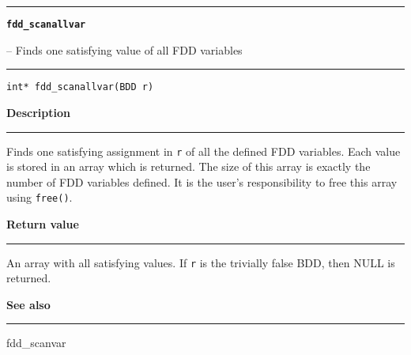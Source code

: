 \begin{minipage}{\textwidth}

\noindent\begin{minipage}{\textwidth}
\rule{\textwidth}{0.5mm}
{\tt\bf fdd\_scanallvar }
\--- Finds one satisfying value of all FDD variables  \hspace{\fill}
\\\rule[1.5ex]{\textwidth}{0.5mm}
\end{minipage}

\noindent\begin{verbatim}
int* fdd_scanallvar(BDD r) 
\end{verbatim}

\vspace{\parsep}\noindent
{\bf Description}\\\rule[1.5ex]{\textwidth}{0.2mm}\vspace{-1.5ex}\setlength{\parindent}{1em}
Finds one satisfying assignment in {\tt r} of all the defined
           FDD variables. Each value is stored in an array which is
	   returned. The size of this array is exactly the number of
	   FDD variables defined. It is the user's responsibility to
	   free this array using {\tt free()}. 

\setlength{\parindent}{0em}\vspace{\parsep}\vspace{\baselineskip}\noindent
{\bf Return value}\\\rule[1.5ex]{\textwidth}{0.2mm}\vspace{-1.5ex}
An array with all satisfying values. If {\tt r} is the trivially
           false BDD, then NULL is returned. 

\vspace{\parsep}\vspace{\baselineskip}\noindent
{\bf See also}\\\rule[1.5ex]{\textwidth}{0.2mm}\vspace{-1.5ex}
fdd\_scanvar 
\end{minipage}
\vspace{8ex}
